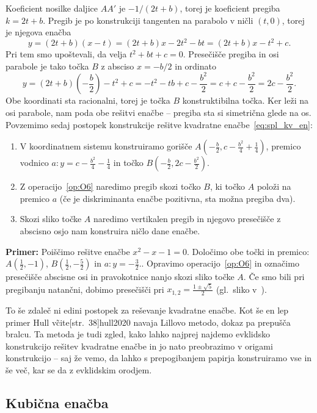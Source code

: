 Koeficient nosilke daljice $AA'$ je $ - 1/(2t + b)$, torej je koeficient pregiba $k = 2t + b$. Pregib je po konstrukciji tangenten na parabolo v ničli $(t, 0)$, torej je njegova enačba
$$ y = (2t + b)(x - t) = (2t + b)x - 2t^2 - bt = (2t + b)x - t^2 + c. $$
Pri tem smo upoštevali, da velja $t^2 + bt + c = 0$. Presečišče pregiba in osi parabole je tako točka $B$ z absciso $ x = -b/2 $ in ordinato
$$ y = (2t + b)\left(-\frac{b}{2}\right) - t^2 + c = - t^2 - tb + c - \frac{b^2}{2} = c + c - \frac{b^2}{2} = 2c - \frac{b^2}{2}.$$
Obe koordinati sta racionalni, torej je točka $B$ konstruktibilna točka. Ker leži na osi parabole, nam poda obe rešitvi enačbe -- pregiba sta si simetrična glede na os. Povzemimo sedaj postopek konstrukcije rešitve kvadratne enačbe~\ref{eq:spl_kv_en}:
\begin{enumerate}
    \item V koordinatnem sistemu konstruiramo gorišče $A\left(-\frac{b}{2}, c - \frac{b^2}{4} + \frac{1}{4}\right)$, premico vodnico $a: y = c - \frac{b^2}{4} - \frac{1}{4}$ in točko $B(-\frac{b}{2}, 2c - \frac{b^2}{2})$.
    \item Z operacijo~\ref{op:O6} naredimo pregib skozi točko $B$, ki točko $A$ položi na premico $a$ (če je diskriminanta enačbe pozitivna, sta možna pregiba dva).
    \item Skozi sliko točke $A$ naredimo vertikalen pregib in njegovo presečišče z abscisno osjo nam konstruira ničlo dane enačbe.
\end{enumerate}

\textbf{Primer:} Poiščimo rešitve enačbe $x^2 - x - 1 = 0$. Določimo obe točki in premico: $A(\frac{1}{2}, -1)$, $B(\frac{1}{2}, -\frac{5}{2})$ in $a: y = -\frac{3}{2}.$. Opravimo operacijo~\ref{op:O6} in označimo presečišče abscisne osi in pravokotnice nanjo skozi sliko točke $A$. Če smo bili pri pregibanju natančni, dobimo presečišči pri $x_{1,2} = \frac{1 \pm \sqrt{5}}{2}$ (gl.\ sliko v~\cite[str.\ 37]{hull2020}).

To še zdaleč ni edini postopek za reševanje kvadratne enačbe. Kot še en lep primer Hull v\~cite[str.\ 38]{hull2020} navaja Lillovo metodo, dokaz pa prepušča bralcu. Ta metoda je tudi zgled, kako lahko najprej najdemo evklidsko konstrukcijo rešitev kvadratne enačbe in jo nato preobrazimo v origami konstrukcijo -- saj že vemo, da lahko s prepogibanjem papirja konstruiramo vse in še več, kar se da z evklidskim orodjem.

\subsection{Kubična enačba}

